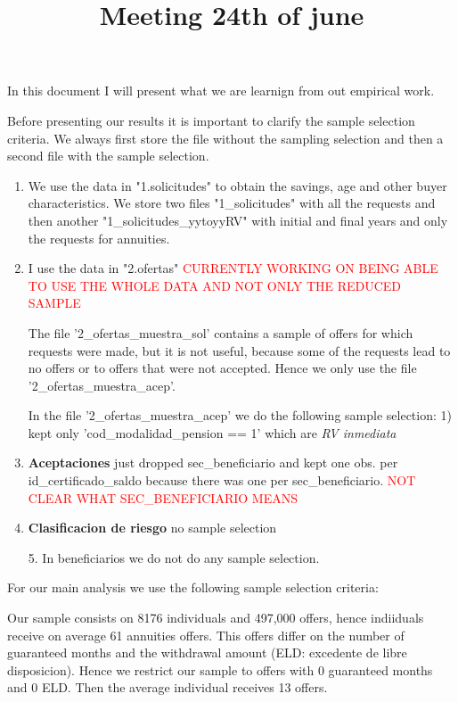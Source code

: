 \documentclass[12pt]{article}
\begin{document}
\title{Meeting 24th of june}

\maketitle

In this document I will present what we are learnign from out empirical work. 

Before presenting our results it is important to clarify the sample selection criteria. We always first store the file without the sampling selection and then a second file with the sample selection. 

\begin{enumerate}
    \item We use the data in "1.solicitudes" to obtain the savings, age and other buyer characteristics. We store two files "1\_solicitudes" with all the requests and then another "1\_solicitudes\_yytoyyRV" with initial and final years and only the requests for annuities. 

    \item I use the data in "2.ofertas" \textcolor{red}{CURRENTLY WORKING ON BEING ABLE TO USE THE WHOLE DATA AND NOT ONLY THE REDUCED SAMPLE}
    
    The file '2\_ofertas\_muestra\_sol' contains a sample of offers for which requests were made, but it is not useful, because some of the requests lead to no offers or to offers that were not accepted. Hence we only use the file '2\_ofertas\_muestra\_acep'. 

    In the file '2\_ofertas\_muestra\_acep' we do the following sample selection: 1) kept only 'cod\_modalidad\_pension == 1' which are \textit{RV inmediata} 


    \item \textbf{Aceptaciones} just dropped sec\_beneficiario and kept one obs. per id\_certificado\_saldo because there was one per sec\_beneficiario. 
    \textcolor{red}{NOT CLEAR WHAT SEC\_BENEFICIARIO MEANS}

    \item \textbf{Clasificacion de riesgo} no sample selection

    \item[5.] In beneficiarios we do not do any sample selection. 
\end{enumerate}



For our main analysis we use the following sample selection criteria: 

Our sample consists on 8176 individuals and 497,000 offers, hence indiiduals receive on average 61 annuities offers. This offers differ on the number of guaranteed months and the withdrawal amount (ELD: excedente de libre disposicion). Hence we restrict our sample to offers with 0 guaranteed months and 0 ELD. Then the average individual receives 13 offers. 
\end{document}
